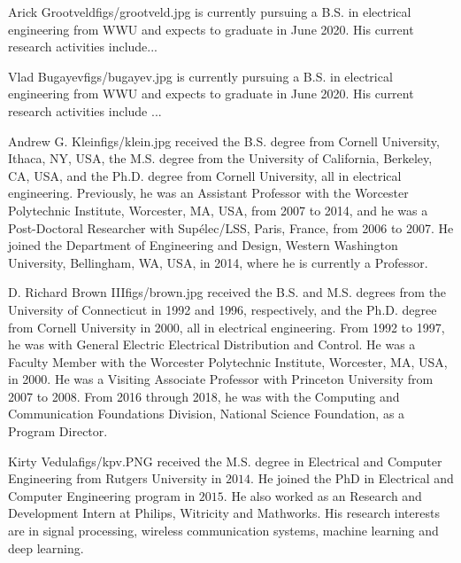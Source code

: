 \documentclass[twocolumn,letterpaper]{IEEEAerospaceCLS}  %
\begin{document}
\newpage
\thebiography
\begin{biographywithpic}
{Arick Grootveld}{figs/grootveld.jpg}
is currently pursuing a B.S. in electrical engineering from WWU and expects to graduate in June 2020. His current research activities include... 

\end{biographywithpic}

\begin{biographywithpic}
{Vlad Bugayev}{figs/bugayev.jpg}
is currently pursuing a B.S. in electrical engineering from WWU and expects to graduate in June 2020. His current research activities include ...

\end{biographywithpic}

\begin{biographywithpic}
{Andrew G. Klein}{figs/klein.jpg}
received the B.S. degree from Cornell University, Ithaca,
NY, USA, the M.S. degree from the University of
California, Berkeley, CA, USA, and the Ph.D.
degree from Cornell University, all in electrical
engineering. Previously, he was an Assistant Professor with the Worcester Polytechnic Institute,
Worcester, MA, USA, from 2007 to 2014, and he
was a Post-Doctoral Researcher with Sup\'{e}lec/LSS,
Paris, France, from 2006 to 2007. He joined the
Department of Engineering and Design, Western
Washington University, Bellingham, WA, USA, in 2014, where he is currently
a Professor.
\end{biographywithpic}

\begin{biographywithpic}
{D. Richard Brown III}{figs/brown.jpg}
received the B.S. and M.S. degrees from the University of Connecticut in 1992 and 1996, respectively, and the Ph.D. degree from Cornell University
in 2000, all in electrical engineering. From 1992
to 1997, he was with General Electric Electrical
Distribution and Control. He was a Faculty Member
with the Worcester Polytechnic Institute, Worcester,
MA, USA, in 2000. He was a Visiting Associate
Professor with Princeton University from 2007 to
2008. From 2016 through 2018, he was with the Computing
and Communication Foundations Division, National Science Foundation, as
a Program Director.
\end{biographywithpic}

\begin{biographywithpic}
{Kirty Vedula}{figs/kpv.PNG} received the M.S. degree in Electrical and Computer Engineering from Rutgers University in $2014$. He joined the PhD in Electrical and Computer Engineering program in $2015$.  He also worked as an Research and Development Intern at Philips, Witricity and Mathworks. His research interests are in signal processing, wireless communication systems, machine learning and deep learning.
\end{biographywithpic}
\end{document}
